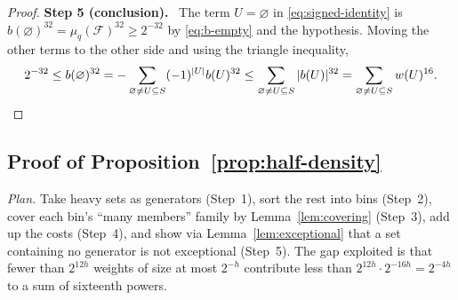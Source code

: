 \documentclass[11pt,letterpaper]{article}
\theoremstyle{definition}
\theoremstyle{remark}
\numberwithin{equation}{section}
\newcommand{\step}[1]{\par\medskip\noindent\textbf{#1}\ }
\begin{document}
\begin{proof}
\step{Step 5 (conclusion).}
The term $U=\varnothing$ in \eqref{eq:signed-identity} is
$b(\varnothing)^{32}=\mu_q(\mathcal F)^{32}\ge2^{-32}$ by
\eqref{eq:b-empty} and the hypothesis. Moving the other terms to the other
side and using the triangle inequality,
\[
 2^{-32}\le b(\varnothing)^{32}
 =-\sum_{\varnothing\ne U\subseteq S}(-1)^{|U|}b(U)^{32}
 \le\sum_{\varnothing\ne U\subseteq S}|b(U)|^{32}
 =\sum_{\varnothing\ne U\subseteq S}w(U)^{16}. \qedhere
\]
\end{proof}

\subsection{Proof of Proposition~\ref{prop:half-density}}

\emph{Plan.} Take heavy sets as generators (Step~1), sort the rest into
bins (Step~2), cover each bin's ``many members'' family by
Lemma~\ref{lem:covering} (Step~3), add up the costs (Step~4), and show via
Lemma~\ref{lem:exceptional} that a set containing no generator is not
exceptional (Step~5). The gap exploited is that fewer than $2^{12h}$ weights
of size at most $2^{-h}$ contribute less than
$2^{12h}\cdot2^{-16h}=2^{-4h}$ to a sum of sixteenth powers.
\end{document}
